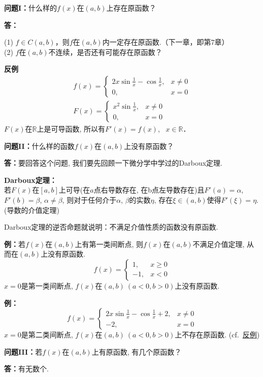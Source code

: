 \documentclass[a4paper,punct=CCT]{ctexbook}
\newcommand*{\hangpar}[2]{\hangindent=1.2cm \textbf{#1}\\[6pt]#2}
\theoremstyle{definition}
\theoremstyle{remark}
\let\geq\geqslant
\let\ge\geq}
\begin{document}
\textbf{问题I：}什么样的$f(x)$在$(a,b)$上存在原函数？

\textbf{答：}\parbox[t]{5in}{
(1) $ f \in C(a,b) $，则$ f $在$(a,b)$内一定存在原函数.（下一章，即第7章）\\
(2) $f$在$(a,b)$不连续，是否还有可能存在原函数？}

\hypertarget{eg:discontI}{}
\textbf{反例}
\begin{gather*}
	f(x) =
	\begin{cases}
		2x \sin \frac{1}{x} - \cos \frac{1}{x}, & x \ne 0 \\
		0, & x = 0
	\end{cases} \\
	F(x) =
	\begin{cases}
		x^2 \sin \frac{1}{x}, & x \ne 0 \\
		0, & x = 0
	\end{cases}
\end{gather*}
$F(x)$在$\mathbb{R}$上是可导函数, 所以有$F'(x) = f(x)$, \ $x \in \mathbb{R}$．

\textbf{问题II：}什么样的函数$f(x)$在$(a,b)$上没有原函数？

\textbf{答：}要回答这个问题, 我们要先回顾一下微分学中学过的Darboux定理.

\hangpar{Darboux定理：}{
若$F(x)$在$[a,b]$上可导(在$a$点右导数存在, 在b点左导数存在)且$F'(a) = \alpha$,
$F'(b) = \beta$, $\alpha \ne \beta$, 则对于任何介于$\alpha$, $\beta$的实数$\eta$,
存在$\xi \in (a,b) $使得$F'(\xi) = \eta$. (导数的介值定理) }

Darboux定理的逆否命题就说明：不满足介值性质的函数没有原函数.

\textbf{例：}若$f(x)$在$(a,b)$上有第一类间断点, 则$f(x)$在$(a,b)$不满足介值定理,
从而在$(a,b)$上没有原函数.
\[f(x) = \begin{cases}
    1, & x \ge 0 \\
    -1, & x < 0
  \end{cases}\]
$x = 0$是第一类间断点, $f(x)$在$(a,b)\ (a<0, b>0)$上没有原函数.

\textbf{例：}
\[f(x) = \begin{cases}
    2x \sin \frac{1}{x} - \cos \frac{1}{x} + 2, & x \ne 0 \\
    -2, & x = 0
  \end{cases}\]
$x=0$是第二类间断点, $f(x)$在$(a,b)\ (a<0, b>0)$上不存在原函数. (cf.~\hyperlink{eg:discontI}{反例})

\textbf{问题III：}若$f(x)$在$(a,b)$上有原函数, 有几个原函数？

\textbf{答：}有无数个.
\end{document}
